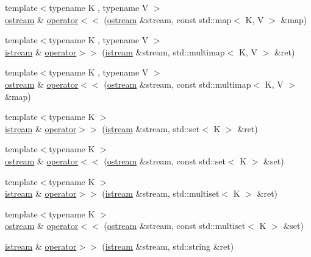 \begin{DoxyCompactItemize}
{\footnotesize template$<$typename K , typename V $>$ }\\\hyperlink{classmui_1_1ostream}{ostream} \& \hyperlink{namespacemui_a215650389625167f2202a56b91911c08}{operator$<$$<$} (\hyperlink{classmui_1_1ostream}{ostream} \&stream, const std\+::map$<$ K, V $>$ \&map)
\item 
{\footnotesize template$<$typename K , typename V $>$ }\\\hyperlink{classmui_1_1istream}{istream} \& \hyperlink{namespacemui_a2f8b4027a1269872ecb719ab51f72f54}{operator$>$$>$} (\hyperlink{classmui_1_1istream}{istream} \&stream, std\+::multimap$<$ K, V $>$ \&ret)
\item 
{\footnotesize template$<$typename K , typename V $>$ }\\\hyperlink{classmui_1_1ostream}{ostream} \& \hyperlink{namespacemui_ae1313f9a9f6b09da631252d3e0b1e816}{operator$<$$<$} (\hyperlink{classmui_1_1ostream}{ostream} \&stream, const std\+::multimap$<$ K, V $>$ \&map)
\item 
{\footnotesize template$<$typename K $>$ }\\\hyperlink{classmui_1_1istream}{istream} \& \hyperlink{namespacemui_af5f7e7c2c8fb5cf56e439ba5f92bc322}{operator$>$$>$} (\hyperlink{classmui_1_1istream}{istream} \&stream, std\+::set$<$ K $>$ \&ret)
\item 
{\footnotesize template$<$typename K $>$ }\\\hyperlink{classmui_1_1ostream}{ostream} \& \hyperlink{namespacemui_aa039195d937aaf19f0b342a210452567}{operator$<$$<$} (\hyperlink{classmui_1_1ostream}{ostream} \&stream, const std\+::set$<$ K $>$ \&set)
\item 
{\footnotesize template$<$typename K $>$ }\\\hyperlink{classmui_1_1istream}{istream} \& \hyperlink{namespacemui_af42f3202ee63df10d4df353f88eb16d4}{operator$>$$>$} (\hyperlink{classmui_1_1istream}{istream} \&stream, std\+::multiset$<$ K $>$ \&ret)
\item 
{\footnotesize template$<$typename K $>$ }\\\hyperlink{classmui_1_1ostream}{ostream} \& \hyperlink{namespacemui_ae3f4463532b4a78282cf04736196bdc4}{operator$<$$<$} (\hyperlink{classmui_1_1ostream}{ostream} \&stream, const std\+::multiset$<$ K $>$ \&set)
\item 
\hyperlink{classmui_1_1istream}{istream} \& \hyperlink{namespacemui_a1a3a45788017c2540398d1ef559f47c4}{operator$>$$>$} (\hyperlink{classmui_1_1istream}{istream} \&stream, std\+::string \&ret)
\item 

\end{DoxyCompactItemize}
